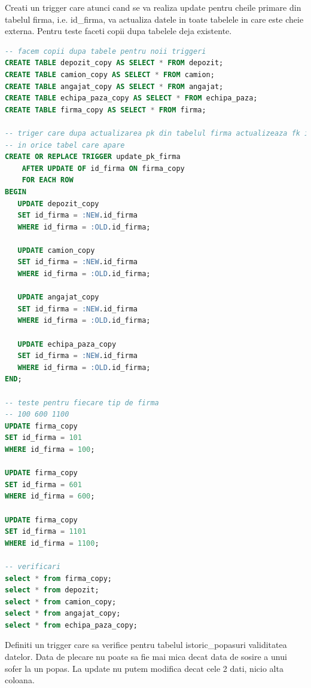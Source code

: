 \documentclass[12pt, a4paper]{article}
\begin{document}
Creati un trigger care atunci cand se va realiza update pentru cheile primare
din tabelul firma, i.e. id\_firma, va actualiza datele in toate tabelele in care este
cheie externa. Pentru teste faceti copii dupa tabelele deja existente.

\begin{lstlisting}[language=SQL]
-- facem copii dupa tabele pentru noii triggeri
CREATE TABLE depozit_copy AS SELECT * FROM depozit;
CREATE TABLE camion_copy AS SELECT * FROM camion;
CREATE TABLE angajat_copy AS SELECT * FROM angajat;
CREATE TABLE echipa_paza_copy AS SELECT * FROM echipa_paza;
CREATE TABLE firma_copy AS SELECT * FROM firma;

-- triger care dupa actualizarea pk din tabelul firma actualizeaza fk id_firma
-- in orice tabel care apare
CREATE OR REPLACE TRIGGER update_pk_firma
    AFTER UPDATE OF id_firma ON firma_copy
    FOR EACH ROW
BEGIN
   UPDATE depozit_copy
   SET id_firma = :NEW.id_firma
   WHERE id_firma = :OLD.id_firma;
   
   UPDATE camion_copy
   SET id_firma = :NEW.id_firma
   WHERE id_firma = :OLD.id_firma;
   
   UPDATE angajat_copy
   SET id_firma = :NEW.id_firma
   WHERE id_firma = :OLD.id_firma;
   
   UPDATE echipa_paza_copy
   SET id_firma = :NEW.id_firma
   WHERE id_firma = :OLD.id_firma;
END;

-- teste pentru fiecare tip de firma
-- 100 600 1100
UPDATE firma_copy
SET id_firma = 101
WHERE id_firma = 100;

UPDATE firma_copy
SET id_firma = 601
WHERE id_firma = 600;

UPDATE firma_copy
SET id_firma = 1101
WHERE id_firma = 1100;

-- verificari
select * from firma_copy; 
select * from depozit;
select * from camion_copy;
select * from angajat_copy;
select * from echipa_paza_copy;
\end{lstlisting}

Definiti un trigger care sa verifice pentru tabelul istoric\_popasuri
validitatea datelor. Data de plecare nu poate sa fie mai mica decat
data de sosire a unui sofer la un popas. La update nu putem modifica
decat cele 2 dati, nicio alta coloana.
\end{document}
